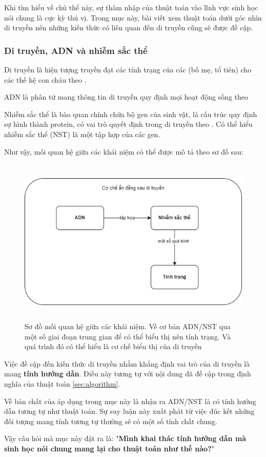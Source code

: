 Khi tìm hiểu về chủ thể này, sự thâm nhập của thuật toán vào lĩnh vực sinh học nói chung là cực kỳ thú vị. Trong mục này, bài viết xem thuật toán dưới góc nhìn di truyền nên những kiến thức có liên quan đến di truyền cũng sẽ được đề cập.

\subsubsection{Di truyền, ADN và nhiễm sắc thể}
Di truyền là hiện tượng truyền đạt các tính trạng của các (bố mẹ, tổ tiên) cho các thế hệ con cháu theo \cite{whatIsGenetic}.

ADN là phân tử mang thông tin di truyền quy định mọi hoạt động sống theo \cite{whatIsDNA}

Nhiễm sắc thể là bào quan chính chứa bộ gen của sinh vật, là cấu trúc quy định sự hình thành protein, có vai trò quyết định trong di truyền theo \cite{whatIsChronosome}. Có thể hiểu nhiễm sắc thể (NST) là một tập hợp của các gen.

Như vậy, mối quan hệ giữa các khái niệm có thể được mô tả theo sơ đồ sau:
\begin{figure}[h]
	\centering
	\includegraphics[scale=0.5, height=8cm]{figures/genetic_illustration_diagram.png}
	\caption{Sơ đồ mối quan hệ giữa các khái niệm. Về cơ bản ADN/NST qua một số giai đoạn trung gian để có thể biểu thị nên tính trạng. Và quá trình đó có thể hiểu là cơ chế biểu thị của di truyền}
	\label{fig:genetic_illustration_diagram}
\end{figure}

\noindent
Việc đề cập đến kiến thức di truyền nhằm khẳng định vai trò của di truyền là mang \textbf{tính hướng dẫn}. Điều này tương tự với nội dung đã đề cập trong định nghĩa của thuật toán \ref{sec:algorithm}.

Về bản chất của áp dụng trong mục này là nhận ra ADN/NST là có tính hướng dẫn tương tự như thuật toán. Sự suy luận này xuất phát từ việc đúc kết những đối tượng mang tính tương tự thường sẽ có một số tính chất chung.

Vậy câu hỏi mà mục này đặt ra là: "\textbf{Mình khai thác tính hướng dẫn mà sinh học nói chung mang lại cho thuật toán như thế nào?}"

